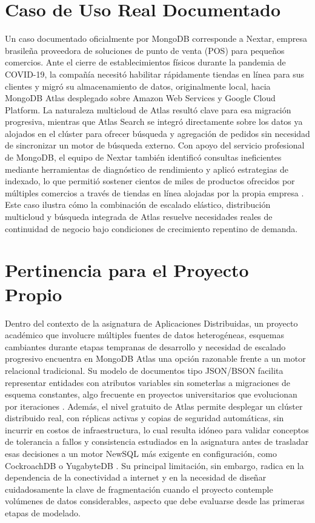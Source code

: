 \documentclass[10pt,journal]{IEEEtran}
\begin{document}
\section{Caso de Uso Real Documentado}
Un caso documentado oficialmente por MongoDB corresponde a Nextar, empresa brasile\~na proveedora de soluciones de punto de venta (POS) para peque\~nos comercios. Ante el cierre de establecimientos f\'isicos durante la pandemia de COVID-19, la compa\~n\'ia necesit\'o habilitar r\'apidamente tiendas en l\'inea para sus clientes y migr\'o su almacenamiento de datos, originalmente local, hacia MongoDB Atlas desplegado sobre Amazon Web Services y Google Cloud Platform. La naturaleza multicloud de Atlas result\'o clave para esa migraci\'on progresiva, mientras que Atlas Search se integr\'o directamente sobre los datos ya alojados en el cl\'uster para ofrecer b\'usqueda y agregaci\'on de pedidos sin necesidad de sincronizar un motor de b\'usqueda externo. Con apoyo del servicio profesional de MongoDB, el equipo de Nextar tambi\'en identific\'o consultas ineficientes mediante herramientas de diagn\'ostico de rendimiento y aplic\'o estrategias de indexado, lo que permiti\'o sostener cientos de miles de productos ofrecidos por m\'ultiples comercios a trav\'es de tiendas en l\'inea alojadas por la propia empresa \cite{mongodb2024nextar}. Este caso ilustra c\'omo la combinaci\'on de escalado el\'astico, distribuci\'on multicloud y b\'usqueda integrada de Atlas resuelve necesidades reales de continuidad de negocio bajo condiciones de crecimiento repentino de demanda.

\section{Pertinencia para el Proyecto Propio}
Dentro del contexto de la asignatura de Aplicaciones Distribuidas, un proyecto acad\'emico que involucre m\'ultiples fuentes de datos heterog\'eneas, esquemas cambiantes durante etapas tempranas de desarrollo y necesidad de escalado progresivo encuentra en MongoDB Atlas una opci\'on razonable frente a un motor relacional tradicional. Su modelo de documentos tipo JSON/BSON facilita representar entidades con atributos variables sin someterlas a migraciones de esquema constantes, algo frecuente en proyectos universitarios que evolucionan por iteraciones \cite{kim2020migracion}. Adem\'as, el nivel gratuito de Atlas permite desplegar un cl\'uster distribuido real, con r\'eplicas activas y copias de seguridad autom\'aticas, sin incurrir en costos de infraestructura, lo cual resulta id\'oneo para validar conceptos de tolerancia a fallos y consistencia estudiados en la asignatura antes de trasladar esas decisiones a un motor NewSQL m\'as exigente en configuraci\'on, como CockroachDB o YugabyteDB \cite{dasilva2023evaluation}. Su principal limitaci\'on, sin embargo, radica en la dependencia de la conectividad a internet y en la necesidad de dise\~nar cuidadosamente la clave de fragmentaci\'on cuando el proyecto contemple vol\'umenes de datos considerables, aspecto que debe evaluarse desde las primeras etapas de modelado.
\end{document}
